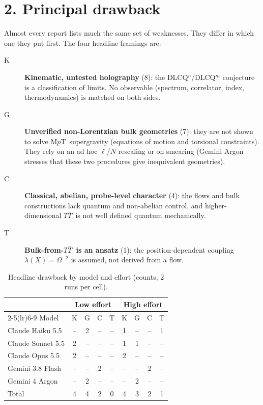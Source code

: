 \documentclass[11pt,a4paper]{article}
\newcommand{\MpT}{M$p$T}
\newcommand{\TTbar}{$T\bar T$}
\begin{document}
\section*{2. Principal drawback}
Almost every report lists much the same set of weaknesses. They differ in which one they put first. The four headline framings are:
\begin{description}
\item[K] \textbf{Kinematic, untested holography} (8): the DLCQ$^n$/DLCQ$^m$ conjecture is a classification of limits. No observable (spectrum, correlator, index, thermodynamics) is matched on both sides.
\item[G] \textbf{Unverified non-Lorentzian bulk geometries} (7): they are not shown to solve \MpT\ supergravity (equations of motion and torsional constraints). They rely on an ad hoc $\ell$/$N$ rescaling or on smearing (Gemini Argon stresses that these two procedures give inequivalent geometries).
\item[C] \textbf{Classical, abelian, probe-level character} (4): the flows and bulk constructions lack quantum and non-abelian control, and higher-dimensional \TTbar\ is not well defined quantum mechanically.
\item[T] \textbf{Bulk-from-\TTbar\ is an ansatz} (1): the position-dependent coupling $\lambda(X)=\Omega^{-2}$ is assumed, not derived from a flow.
\end{description}

\begin{table}[h]
\centering
\caption{Headline drawback by model and effort (counts; 2 runs per cell).}
\begin{tabular}{l cccc cccc}
\toprule
& \multicolumn{4}{c}{Low effort} & \multicolumn{4}{c}{High effort}\\
\cmidrule(lr){2-5}\cmidrule(lr){6-9}
Model & K & G & C & T & K & G & C & T\\
\midrule
Claude Haiku 5.5  & -- & 2 & -- & -- & 1 & -- & -- & 1\\
Claude Sonnet 5.5 & 2 & -- & -- & -- & 1 & 1 & -- & --\\
Claude Opus 5.5   & 2 & -- & -- & -- & 2 & -- & -- & --\\
Gemini 3.8 Flash  & -- & -- & 2 & -- & -- & -- & 2 & --\\
Gemini 4 Argon    & -- & 2 & -- & -- & -- & 2 & -- & --\\
\midrule
Total             & 4 & 4 & 2 & 0 & 4 & 3 & 2 & 1\\
\bottomrule
\end{tabular}
\end{table}
\end{document}
